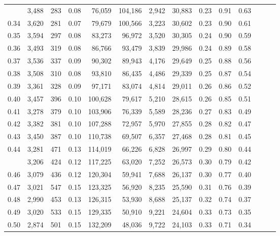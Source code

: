 \begin{tabular}{rrrrrrrrrrrrrr}
\begin{comment}
0.33 &  3,488 &  283 &  0.08 &   76,059 &  104,186 &   2,942 &  30,883 &  0.23 &  0.91 &      0.63 \\
0.34 &  3,620 &  281 &  0.07 &   79,679 &  100,566 &   3,223 &  30,602 &  0.23 &  0.90 &      0.61 \\
0.35 &  3,594 &  297 &  0.08 &   83,273 &   96,972 &   3,520 &  30,305 &  0.24 &  0.90 &      0.59 \\
0.36 &  3,493 &  319 &  0.08 &   86,766 &   93,479 &   3,839 &  29,986 &  0.24 &  0.89 &      0.58 \\
0.37 &  3,536 &  337 &  0.09 &   90,302 &   89,943 &   4,176 &  29,649 &  0.25 &  0.88 &      0.56 \\
0.38 &  3,508 &  310 &  0.08 &   93,810 &   86,435 &   4,486 &  29,339 &  0.25 &  0.87 &      0.54 \\
0.39 &  3,361 &  328 &  0.09 &   97,171 &   83,074 &   4,814 &  29,011 &  0.26 &  0.86 &      0.52 \\
0.40 &  3,457 &  396 &  0.10 &  100,628 &   79,617 &   5,210 &  28,615 &  0.26 &  0.85 &      0.51 \\
0.41 &  3,278 &  379 &  0.10 &  103,906 &   76,339 &   5,589 &  28,236 &  0.27 &  0.83 &      0.49 \\
0.42 &  3,382 &  381 &  0.10 &  107,288 &   72,957 &   5,970 &  27,855 &  0.28 &  0.82 &      0.47 \\
0.43 &  3,450 &  387 &  0.10 &  110,738 &   69,507 &   6,357 &  27,468 &  0.28 &  0.81 &      0.45 \\
0.44 &  3,281 &  471 &  0.13 &  114,019 &   66,226 &   6,828 &  26,997 &  0.29 &  0.80 &      0.44 \\
\end{comment}
0.45 &  3,206 &  424 &  0.12 &  117,225 &   63,020 &   7,252 &  26,573 &  0.30 &  0.79 &      0.42 \\
0.46 &  3,079 &  436 &  0.12 &  120,304 &   59,941 &   7,688 &  26,137 &  0.30 &  0.77 &      0.40 \\
0.47 &  3,021 &  547 &  0.15 &  123,325 &   56,920 &   8,235 &  25,590 &  0.31 &  0.76 &      0.39 \\
0.48 &  2,990 &  453 &  0.13 &  126,315 &   53,930 &   8,688 &  25,137 &  0.32 &  0.74 &      0.37 \\
0.49 &  3,020 &  533 &  0.15 &  129,335 &   50,910 &   9,221 &  24,604 &  0.33 &  0.73 &      0.35 \\
0.50 &  2,874 &  501 &  0.15 &  132,209 &   48,036 &   9,722 &  24,103 &  0.33 &  0.71 &      0.34 \\

\end{tabular}
